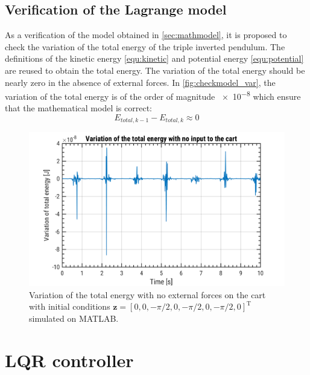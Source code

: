 \documentclass[a4paper,12pt]{article}
\begin{document}
\subsection{Verification of the Lagrange model}
As a verification of the model obtained in \autoref{sec:mathmodel}, it is proposed to check the variation of the total energy of the triple inverted pendulum. The definitions of the kinetic energy \autoref{equ:kinetic} and potential energy \autoref{equ:potential} are reused to obtain the total energy. The variation of the total energy should be nearly zero in the absence of external forces. In \autoref{fig:checkmodel_var}, the variation of the total energy is of the order of magnitude \num{e-8} which ensure that the mathematical model is correct:
\[
E_{total,k-1}-E_{total,k} \approx 0
\]
\begin{figure}[ht]
	\centering
	\includegraphics[width=16cm]{illustrations/check_model_variation.png}
	\caption{Variation of the total energy with no external forces on the cart with initial conditions $\mathbf{z}= [0,0,-\pi/2,0,-\pi/2,0,-\pi/2,0]^\text{T}$ simulated on MATLAB.}
	\label{fig:checkmodel_var}
\end{figure}

\section{LQR controller}
\end{document}
